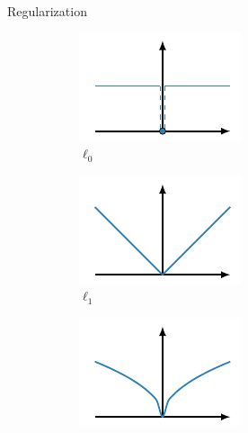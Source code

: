 \documentclass[8pt]{beamer}
\begin{document}
\begin{frame}{Regularization}
\begin{figure}
     \centering
     \begin{subfigure}[b]{0.25\textwidth}
         \centering
         \includegraphics[width=\textwidth]{Figures/l0_regularizer.pdf}
         \caption{$\ell_0$}
     \end{subfigure}%
     \begin{subfigure}[b]{0.25\textwidth}
         \centering
         \includegraphics[width=\textwidth]{Figures/l1_regularizer.pdf}
         \caption{$\ell_1$}
     \end{subfigure}%
     \begin{subfigure}[b]{0.25\textwidth}
         \centering
         \includegraphics[width=\textwidth]{Figures/lh_regularizer.pdf}

\end{subfigure}
\end{figure}
\end{frame}
\end{document}
